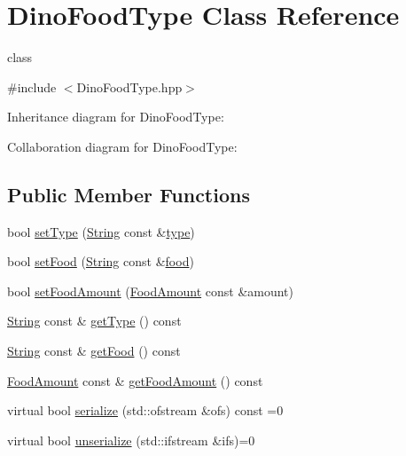 \hypertarget{classDinoFoodType}{}\section{Dino\+Food\+Type Class Reference}
\label{classDinoFoodType}


class  




{\ttfamily \#include $<$Dino\+Food\+Type.\+hpp$>$}



Inheritance diagram for Dino\+Food\+Type\+:


Collaboration diagram for Dino\+Food\+Type\+:
\subsection*{Public Member Functions}
\begin{DoxyCompactItemize}
\item 
bool \hyperlink{classDinoFoodType_ae770be06031c3f7e3b0d25a9508320eb}{set\+Type} (\hyperlink{classString}{String} const \&\hyperlink{classDinoFoodType_afb414c3cfef06b7e74361f92296a3b13}{type})
\item 
bool \hyperlink{classDinoFoodType_a35d060a217084fbb2effd3eea783c2be}{set\+Food} (\hyperlink{classString}{String} const \&\hyperlink{classDinoFoodType_acb68d96669c399a87f3f6d2d19040564}{food})
\item 
bool \hyperlink{classDinoFoodType_aff41b0cd6c54bf4510d1bf7441bc5bfd}{set\+Food\+Amount} (\hyperlink{DinoFoodType_8hpp_a81be3c5791355e37ef9afec946f6ff50}{Food\+Amount} const \&amount)
\item 
\hyperlink{classString}{String} const  \& \hyperlink{classDinoFoodType_ac03f15d756071438462663444e980b51}{get\+Type} () const
\item 
\hyperlink{classString}{String} const  \& \hyperlink{classDinoFoodType_aea2afe68c1b56bb7876604e1ec13af33}{get\+Food} () const
\item 
\hyperlink{DinoFoodType_8hpp_a81be3c5791355e37ef9afec946f6ff50}{Food\+Amount} const  \& \hyperlink{classDinoFoodType_a974a248bce08baa48360b5b2c6858263}{get\+Food\+Amount} () const
\item 
virtual bool \hyperlink{classDinoFoodType_a3654985e0619a24a19bda8280557651e}{serialize} (std\+::ofstream \&ofs) const =0
\item 
virtual bool \hyperlink{classDinoFoodType_a05018adfc6e5cbf1e7a28d77eab5cf84}{unserialize} (std\+::ifstream \&ifs)=0
\end{DoxyCompactItemize}
